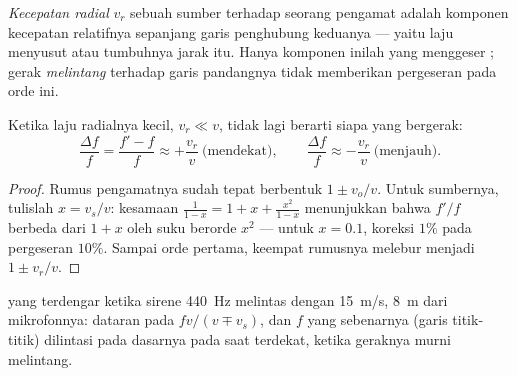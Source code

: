 \begin{definition}\label{def:g12:doppler-effect:radial}
\emph{Kecepatan radial} $v_r$ sebuah sumber terhadap seorang
pengamat adalah komponen kecepatan relatifnya sepanjang garis penghubung keduanya ---
yaitu laju menyusut atau tumbuhnya jarak itu. Hanya komponen inilah yang menggeser
; gerak \emph{melintang} terhadap garis pandangnya tidak memberikan pergeseran
pada orde ini.
\end{definition}

\begin{proposition}\label{prop:g12:doppler-effect:slow}
Ketika laju radialnya kecil, $v_r \ll v$, tidak lagi berarti siapa yang bergerak:
\[
\frac{\Delta f}{f} = \frac{f' - f}{f} \approx +\frac{v_r}{v} \ \text{(mendekat)},
\qquad
\frac{\Delta f}{f} \approx -\frac{v_r}{v} \ \text{(menjauh)}.
\]
\end{proposition}

\begin{proof}
Rumus pengamatnya sudah tepat berbentuk $1 \pm v_o/v$. Untuk sumbernya, tulislah
$x = v_s/v$: kesamaan $\frac{1}{1 - x} = 1 + x + \frac{x^2}{1 - x}$ menunjukkan bahwa
$f'/f$ berbeda dari $1 + x$ oleh suku berorde $x^2$ --- untuk $x = 0.1$, koreksi $1\%$ pada
pergeseran $10\%$. Sampai orde pertama, keempat rumusnya melebur menjadi $1 \pm v_r/v$.
\end{proof}

\begin{omfigure}

{\small {} yang terdengar ketika sirene \qty{440}{Hz} melintas dengan \qty{15}{m/s},
\qty{8}{m} dari mikrofonnya: dataran pada $fv/(v \mp v_s)$, dan $f$ yang sebenarnya
(garis titik-titik) dilintasi pada dasarnya pada saat terdekat, ketika geraknya murni
melintang.}
\end{omfigure}

